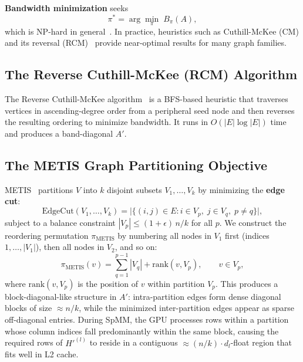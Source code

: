 \documentclass[sigconf,review]{acmart}
\begin{document}
\textbf{Bandwidth minimization} seeks
\begin{equation}\label{eq:bwmin}
    \pi^* = \arg\min_\pi\; B_\pi(A),
\end{equation}
which is NP-hard in general~\cite{papadimitriou1976nphard}. In practice, heuristics such as Cuthill-McKee (CM) and its reversal (RCM)~\cite{cuthill1969bandwidth} provide near-optimal results for many graph families.

\subsection{The Reverse Cuthill-McKee (RCM) Algorithm}
\label{sec:rcm}

The Reverse Cuthill-McKee algorithm~\cite{cuthill1969bandwidth} is a BFS-based heuristic that traverses vertices in ascending-degree order from a peripheral seed node and then reverses the resulting ordering to minimize bandwidth. It runs in $O(|E|\log|E|)$ time and produces a band-diagonal $A'$.

\subsection{The METIS Graph Partitioning Objective}
\label{sec:metis}

METIS~\cite{karypis1998metis} partitions $V$ into $k$ disjoint subsets $V_1, \dots, V_k$ by minimizing the \textbf{edge cut}:
\begin{equation}\label{eq:edgecut}
    \text{EdgeCut}(V_1,\dots,V_k) = \bigl|\{(i,j) \in E : i \in V_p,\; j \in V_q,\; p \neq q\}\bigr|,
\end{equation}
subject to a balance constraint $|V_p| \le (1+\epsilon)\, n/k$ for all $p$. We construct the reordering permutation $\pi_{\text{METIS}}$ by numbering all nodes in $V_1$ first (indices $1,\dots,|V_1|$), then all nodes in $V_2$, and so on:
\begin{equation}\label{eq:metis_perm}
    \pi_{\text{METIS}}(v) = \sum_{q=1}^{p-1} |V_q| + \text{rank}(v, V_p), \qquad v \in V_p,
\end{equation}
where $\text{rank}(v,V_p)$ is the position of $v$ within partition $V_p$. This produces a block-diagonal-like structure in $A'$: intra-partition edges form dense diagonal blocks of size $\approx n/k$, while the minimized inter-partition edges appear as sparse off-diagonal entries. During SpMM, the GPU processes rows within a partition whose column indices fall predominantly within the same block, causing the required rows of $H'^{(l)}$ to reside in a contiguous $\approx (n/k)\cdot d_l$-float region that fits well in L2 cache.
\end{document}
